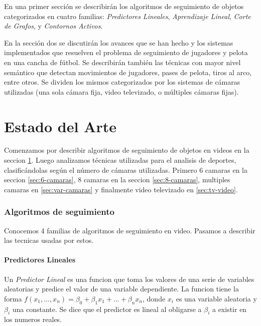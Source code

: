 \documentclass[a4paper,10pt]{article}
\begin{document}
En una primer sección se describirán los algoritmos de seguimiento
de objetos categorizados en cuatro familias:
\textit{Predictores Lineales},
\textit{Aprendizaje Lineal},
\textit{Corte de Grafos},
y \textit{Contornos Activos}.

En la sección dos se discutirán los avances que se han hecho y los sistemas
implementados que resuelven el problema de seguimiento de jugadores y pelota en
una cancha de fútbol. Se describirán también las técnicas con mayor nivel
semántico que detectan movimientos de jugadores, pases de pelota, tiros al
arco, entre otros. Se dividen los mismos categorizados por los sistemas de
cámaras utilizadas (una sola cámara fija, video televizado, o múltiples cámaras
fijas).

\newpage

\part*{Estado del Arte}

Comenzamos por describir algoritmos de seguimiento de objetos en videos en la
seccion \ref{sec:tracking}.  Luego analizamos técnicas utilizadas para el
analisis de deportes, clasificándolas según el número de cámaras utilizadas.
Primero 6 camaras en la seccion \ref{sec:6-camaras}, 8 camaras en la seccion
\ref{sec:8-camaras}, multiples camaras en \ref{sec:var-camaras} y finalmente
video televizado en \ref{sec:tv-video}.

\section{Algoritmos de seguimiento}
\label{sec:tracking}

Conocemos 4 familias de algoritmos de seguimiento en video.
Pasamos a describir las tecnicas usadas por estos.

\subsection{Predictores Lineales}

Un \textit{Predictor Lineal} es una funcion que toma los valores de una serie
de variables aleatorias y predice el valor de una variable dependiente.  La
funcion tiene la forma $f(x_1, ..., x_n) = \beta_0 + \beta_1 x_1 + \dots +
\beta_n x_n$, donde $x_i$ es una variable aleatoria y $\beta_i$ una constante.
Se dice que el predictor es lineal al obligarse a $\beta_i$ a existir en los
numeros reales.
\end{document}
